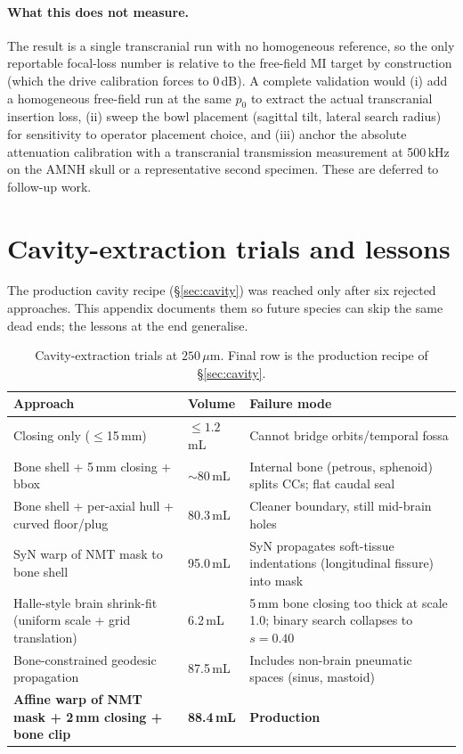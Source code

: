 \documentclass{compactarticle}
\begin{document}
\paragraph{What this does not measure.}
The result is a single transcranial run with no homogeneous reference,
so the only reportable focal-loss number is relative to the
free-field MI target by construction (which the drive calibration
forces to $0$\,dB). A complete validation would (i) add a homogeneous
free-field run at the same $p_0$ to extract the actual transcranial
insertion loss, (ii) sweep the bowl placement (sagittal tilt, lateral
search radius) for sensitivity to operator placement choice, and
(iii) anchor the absolute attenuation calibration with a transcranial
transmission measurement at 500\,kHz on the AMNH skull or a
representative second specimen. These are deferred to follow-up work.

\appendix

\section{Cavity-extraction trials and lessons}
\label{app:cavity-trials}

The production cavity recipe (\S\ref{sec:cavity}) was reached only
after six rejected approaches. This appendix documents them so future
species can skip the same dead ends; the lessons at the end generalise.

\begin{table}[H]
\centering
\caption{Cavity-extraction trials at $250$\,$\mu$m. Final row is the
         production recipe of \S\ref{sec:cavity}.}
\label{tab:cavity-trials}
\small
\begin{tabular}{lll}
\hline
Approach & Volume & Failure mode \\
\hline
Closing only ($\le$15\,mm)        & $\le 1.2$\,mL & Cannot bridge orbits/temporal fossa \\
Bone shell + 5\,mm closing + bbox    & $\sim$80\,mL  & Internal bone (petrous, sphenoid) splits CCs; flat caudal seal \\
Bone shell + per-axial hull + curved floor/plug          & 80.3\,mL & Cleaner boundary, still mid-brain holes \\
SyN warp of NMT mask to bone shell    & 95.0\,mL & SyN propagates soft-tissue indentations (longitudinal fissure) into mask \\
Halle-style brain shrink-fit (uniform scale + grid translation) & 6.2\,mL & 5\,mm bone closing too thick at scale 1.0; binary search collapses to $s=0.40$ \\
Bone-constrained geodesic propagation & 87.5\,mL & Includes non-brain pneumatic spaces (sinus, mastoid) \\
\textbf{Affine warp of NMT mask + 2\,mm closing + bone clip}
                                      & \textbf{88.4\,mL} & \textbf{Production} \\
\hline
\end{tabular}
\end{table}
\end{document}
